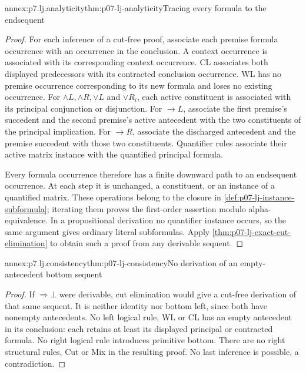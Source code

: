 \begin{annexitem}{annex:p7.lj.analyticity}{thm:p07-lj-analyticity}{Tracing every formula to the endsequent}
\begin{proof}
For each inference of a cut-free proof, associate each premise formula
occurrence with an occurrence in the conclusion.  A context occurrence
is associated with its corresponding context occurrence.  CL associates
both displayed predecessors with its contracted conclusion occurrence.
WL has no premise occurrence corresponding to its new formula and loses
no existing occurrence.  For \(\land L,\land R,\lor L\) and
\(\lor R_i\), each active constituent is associated with its
principal conjunction or disjunction.  For \(\to L\), associate
the first premise's succedent and the second premise's active antecedent
with the two constituents of the principal implication.  For
\(\to R\), associate the discharged antecedent and the premise
succedent with those two constituents.  Quantifier rules associate
their active matrix instance with the quantified principal formula.

Every formula occurrence therefore has a finite downward path to an
endsequent occurrence.  At each step it is unchanged, a constituent,
or an instance of a quantified matrix.  These operations belong to
the closure in \ref{def:p07-lj-instance-subformula}; iterating them
proves the first-order assertion modulo alpha-equivalence.  In a
propositional derivation no quantifier instance occurs, so the same
argument gives ordinary literal subformulas.  Apply
\ref{thm:p07-lj-exact-cut-elimination} to obtain such a proof from
any derivable sequent.
\end{proof}
\end{annexitem}

\begin{annexitem}{annex:p7.lj.consistency}{thm:p07-lj-consistency}{No derivation of an empty-antecedent bottom sequent}
\begin{proof}
If \(\Rightarrow\bot\) were derivable, cut elimination would give
a cut-free derivation of that same sequent.  It is neither identity
nor bottom left, since both have nonempty antecedents.  No left logical
rule, WL or CL has an empty antecedent in its conclusion: each retains
at least its displayed principal or contracted formula.  No right
logical rule introduces primitive bottom.  There are no right
structural rules, Cut or Mix in the resulting proof.  No last
inference is possible, a contradiction.
\end{proof}
\end{annexitem}

